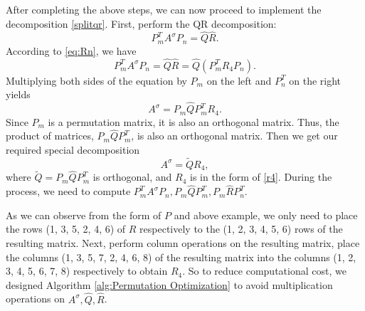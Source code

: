 \documentclass[12pt]{article}
\begin{document}
After completing the above steps, we can now proceed to implement the decomposition \eqref{splitqr}.
First, perform the QR decomposition:
\[P_m^TA^\sigma P_n = \widehat{Q}\widehat{R}.\]
According to \eqref{eq:Rn}, we have
\[P_m^TA^\sigma P_n = \widehat{Q}\widehat{R} = \widehat{Q}(P_m^TR_4P_n).\]
Multiplying both sides of the equation by $P_m$ on the left and $P_n^T$ on the right yields
\[A^\sigma=P_m\widehat{Q}P_m^T R_4.\]
 Since $P_m$ is a permutation matrix, it is also an orthogonal matrix. Thus, the product of matrices, $P_m\widehat{Q}P_m^T$, is also an orthogonal matrix. Then we get our required special decomposition \[A^\sigma=\widetilde{Q}R_4,\] where $\widetilde{Q}=P_m\widehat{Q}P_m^T$ is orthogonal, and $R_4$ is in the form of \eqref{r4}. During the process, we need to compute 
$P_m^TA^\sigma P_n, P_m\widehat{Q}P_m^T, P_m \widehat{R}P_n^T$. 

{\color{red}As we can observe from the form of $P$ and above example, we only need to place the rows (1, 3, 5, 2, 4, 6) of $R$ respectively to the (1, 2, 3, 4, 5, 6) rows of the resulting matrix. Next, perform column operations on the resulting matrix, place the columns (1, 3, 5, 7, 2, 4, 6, 8) of the resulting matrix into the columns (1, 2, 3, 4, 5, 6, 7, 8) respectively to obtain $R_4$.}
So to reduce computational cost, we designed Algorithm \ref{alg:Permutation Optimization} to avoid multiplication operations on $A^\sigma, \widehat{Q}, \widehat{R}$.

\end{document}
